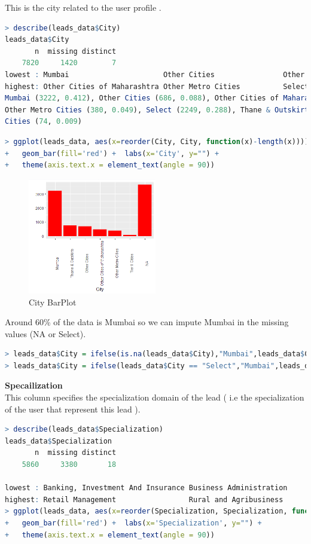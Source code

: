 This is the city related to the user profile .
\begin{lstlisting}[language=R]
> describe(leads_data$City)
leads_data$City 
       n  missing distinct 
    7820     1420        7 
lowest : Mumbai                      Other Cities                Other Cities of Maharashtra Other Metro Cities          Select             
highest: Other Cities of Maharashtra Other Metro Cities          Select                      Thane & Outskirts           Tier II Cities             
Mumbai (3222, 0.412), Other Cities (686, 0.088), Other Cities of Maharashtra (457, 0.058),
Other Metro Cities (380, 0.049), Select (2249, 0.288), Thane & Outskirts (752, 0.096), Tier II
Cities (74, 0.009)
\end{lstlisting}
\begin{lstlisting}[language=R]
> ggplot(leads_data, aes(x=reorder(City, City, function(x)-length(x)))) +
+   geom_bar(fill='red') +  labs(x='City', y="") + 
+   theme(axis.text.x = element_text(angle = 90))
\end{lstlisting}
\begin{figure}[H]
    \centering
    \includegraphics[width=0.5\textwidth]{assets/city.png}
    \caption{ City BarPlot}
\end{figure}
Around 60\% of the data is Mumbai so we can impute Mumbai in the missing values (NA or Select).
\begin{lstlisting}[language=R]
> leads_data$City = ifelse(is.na(leads_data$City),"Mumbai",leads_data$City)
> leads_data$City = ifelse(leads_data$City == "Select","Mumbai",leads_data$City)
\end{lstlisting}
\textbf{Specailization}\\
This column specifies the specialization domain of the lead ( i.e the specialization of the user that represent this lead ).
\begin{lstlisting}[language=R]
> describe(leads_data$Specialization)
leads_data$Specialization 
       n  missing distinct 
    5860     3380       18 

lowest : Banking, Investment And Insurance Business Administration           E-Business                        E-COMMERCE       Finance Management               
highest: Retail Management                 Rural and Agribusiness            Services Excellence               Supply Chain Management Travel and Tourism 
> ggplot(leads_data, aes(x=reorder(Specialization, Specialization, function(x)-length(x)))) +
+   geom_bar(fill='red') +  labs(x='Specialization', y="") + 
+   theme(axis.text.x = element_text(angle = 90))
\end{lstlisting}
